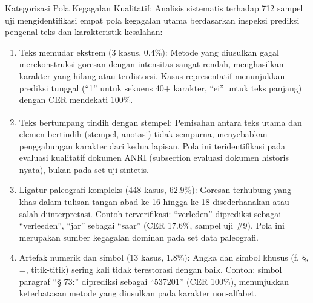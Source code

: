 \documentclass[journal]{IEEEtran}
\begin{document}
Kategorisasi Pola Kegagalan Kualitatif\protect\footnotemark:
Analisis sistematis terhadap 712 sampel uji mengidentifikasi empat pola kegagalan utama berdasarkan inspeksi prediksi pengenal teks dan karakteristik kesalahan:
\begin{enumerate}
    \item Teks memudar ekstrem (3 kasus, 0.4\%): Metode yang diusulkan gagal merekonstruksi goresan dengan intensitas sangat rendah, menghasilkan karakter yang hilang atau terdistorsi. Kasus representatif menunjukkan prediksi tunggal (``1'' untuk sekuens 40+ karakter, ``ei'' untuk teks panjang) dengan CER mendekati 100\%.
    
    \item Teks bertumpang tindih dengan stempel\textsuperscript{\textdagger}: Pemisahan antara teks utama dan elemen bertindih (stempel, anotasi) tidak sempurna, menyebabkan penggabungan karakter dari kedua lapisan. Pola ini teridentifikasi pada evaluasi kualitatif dokumen ANRI (subsection evaluasi dokumen historis nyata), bukan pada set uji sintetis.
    
    \item Ligatur paleografi kompleks (448 kasus, 62.9\%): Goresan terhubung yang khas dalam tulisan tangan abad ke-16 hingga ke-18 disederhanakan atau salah diinterpretasi. Contoh terverifikasi: ``verleden'' diprediksi sebagai ``verleeden'', ``jar'' sebagai ``saar'' (CER 17.6\%, sampel uji \#9). Pola ini merupakan sumber kegagalan dominan pada set data paleografi.
    
    \item Artefak numerik dan simbol (13 kasus, 1.8\%): Angka dan simbol khusus (ƒ, §, =, titik-titik) sering kali tidak terestorasi dengan baik. Contoh: simbol paragraf ``§ 73:'' diprediksi sebagai ``537201'' (CER 100\%), menunjukkan keterbatasan metode yang diusulkan pada karakter non-alfabet.

\end{enumerate}
\end{document}
